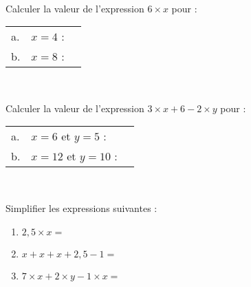 \documentclass[a4paper,12pt,landscape,twocolumn]{article}
\begin{document}
{	\begin{exercice}\

		Calculer la valeur de l'expression $6 × x$ pour : \vspace{0.5em}

		\begin{tabular}{llm{4cm}}
			a. & $x = 4$ : & \dotfill \\ %
			b. & $x = 8$ : & \dotfill \\ %
		\end{tabular}
	\end{exercice}

	\begin{exercice}\

		Calculer la valeur de l'expression $3 × x + 6 - 2 × y$ pour : \vspace{0.5em}

		\begin{tabular}{llm{4cm}}
			a. & $x = 6$ et $y = 5$ :   & \dotfill \\ %
			b. & $x = 12$ et $y = 10$ : & \dotfill \\ %
		\end{tabular}
	\end{exercice}

	\begin{exercice}\

		Simplifier les expressions suivantes : \vspace{0.5em}
		\begin{enumerate}[label=\alph*.]
			\setlength\itemsep{5pt}
			\item $2{,}5 × x = $ \dotfill
			\item $x + x + x + 2{,}5 - 1 = $ \dotfill
			\item $7 × x + 2 × y  - 1 × x = $ \dotfill
		\end{enumerate}
	\end{exercice}
}

\newpage

\setcounter{exercice}{0}
\end{document}
